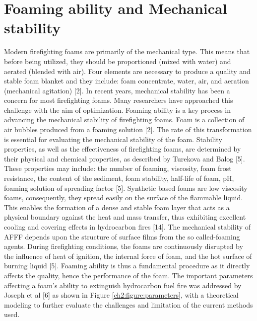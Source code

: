 \documentclass[12pt]{report}
\begin{document}
\section{Foaming ability and Mechanical stability}
Modern firefighting foams are primarily of the mechanical type. This means that before being utilized, they should be proportioned (mixed with water) and aerated (blended with air). Four elements are necessary to produce a quality and stable foam blanket and they include: foam concentrate, water, air, and aeration (mechanical agitation) [2].
In recent years, mechanical stability has been a concern for most firefighting foams. Many researchers have approached this challenge with the aim of optimization. Foaming ability is a key process in advancing the mechanical stability of firefighting foams. Foam is a collection of air bubbles produced from a foaming solution [2]. The rate of this transformation is essential for evaluating the mechanical stability of the foam. Stability properties, as well as the effectiveness of firefighting foams, are determined by their physical and chemical properties, as described by Turekova and Balog [5]. These properties may include: the number of foaming, viscosity, foam frost resistance, the content of the sediment, foam stability, half-life of foam, pH, foaming solution of spreading factor [5].
Synthetic based foams are low viscosity foams, consequently, they spread easily on the surface of the flammable liquid. This enables the formation of a dense and stable foam layer that acts as a physical boundary against the heat and mass transfer, thus exhibiting excellent cooling and covering effects in hydrocarbon fires [14]. The mechanical stability of AFFF depends upon the structure of surface films from the so called-foaming agents. During firefighting conditions, the foams are continuously disrupted by the influence of heat of ignition, the internal force of foam, and the hot surface of burning liquid [5]. Foaming ability is thus a fundamental procedure as it directly affects the quality, hence the performance of the foam. The important parameters affecting a foam's ability to extinguish hydrocarbon fuel fire was addressed by Joseph et al [6] as shown in Figure \ref{ch2:figure:parameters}, with a theoretical modeling to further evaluate the challenges and limitation of the current methods used. 
\end{document}
